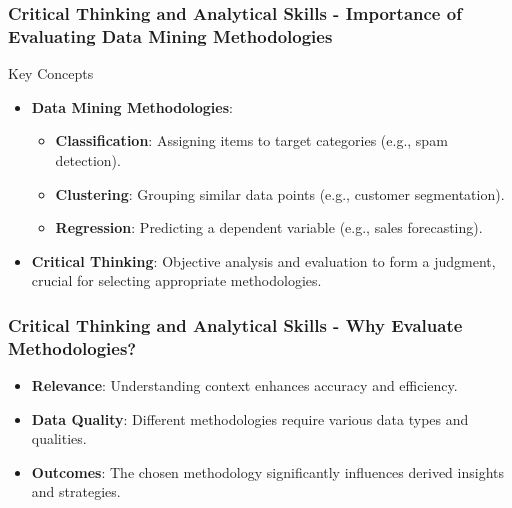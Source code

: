\documentclass{beamer}
\begin{document}
\begin{frame}[fragile]
    \frametitle{Critical Thinking and Analytical Skills - Importance of Evaluating Data Mining Methodologies}
    
    \begin{block}{Key Concepts}
        \begin{itemize}
            \item \textbf{Data Mining Methodologies}:
            \begin{itemize}
                \item \textbf{Classification}: Assigning items to target categories (e.g., spam detection).
                \item \textbf{Clustering}: Grouping similar data points (e.g., customer segmentation).
                \item \textbf{Regression}: Predicting a dependent variable (e.g., sales forecasting).
            \end{itemize}

            \item \textbf{Critical Thinking}: Objective analysis and evaluation to form a judgment, crucial for selecting appropriate methodologies.
        \end{itemize}
    \end{block}
\end{frame}

\begin{frame}[fragile]
    \frametitle{Critical Thinking and Analytical Skills - Why Evaluate Methodologies?}
    
    \begin{itemize}
        \item \textbf{Relevance}: Understanding context enhances accuracy and efficiency.
        \item \textbf{Data Quality}: Different methodologies require various data types and qualities.
        \item \textbf{Outcomes}: The chosen methodology significantly influences derived insights and strategies.
    \end{itemize}
\end{frame}
\end{document}
